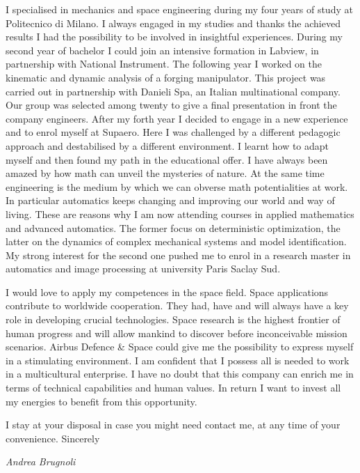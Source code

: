 \documentclass[11pt]{letter}
\begin{document}
 I specialised in mechanics and space engineering during my four years of study at Politecnico di Milano. I always engaged in my studies and thanks the achieved results I had the possibility to be involved in insightful experiences. During my second year of bachelor I could join an intensive formation in Labview, in partnership with National Instrument. The following year I worked on the kinematic and dynamic analysis of a forging manipulator. This project was carried out in partnership with Danieli Spa, an Italian multinational company. Our group was selected among twenty to give a final presentation in front the company engineers. 
 After my forth year I decided to engage in a new experience and to enrol myself at Supaero. Here I was challenged by a different pedagogic approach and destabilised by a different environment.  I learnt how to adapt myself and then found my path in the educational offer. I have always been amazed by how math can unveil the mysteries of nature. At the same time engineering is the medium by which we can obverse math potentialities at work. In particular automatics keeps changing and improving our world  and way of living. These are reasons why I am now attending courses in applied mathematics  and advanced automatics. The former focus on deterministic optimization, the latter on the dynamics of complex mechanical systems and model identification. My strong
interest for the second one pushed me to enrol in a research master in automatics and image processing at university Paris Saclay Sud. 

I would love to apply my competences in the space field. Space applications contribute to worldwide cooperation.  They had, have and will always have a key role in developing crucial technologies. Space research is the highest frontier of human progress and will allow mankind to discover before inconceivable mission scenarios. Airbus Defence \& Space could give me the possibility to express myself in a stimulating environment. I am confident that I possess all is needed to work in a multicultural enterprise.  I have no doubt that this company can enrich me in terms of technical capabilities and human values. In return I want to invest all my energies to benefit from this opportunity.

I stay at your disposal in case you might need contact me, at any time of your convenience.
Sincerely
 \begin{center}
 \large\textit{Andrea Brugnoli}
 \end{center}
 
\end{document}
